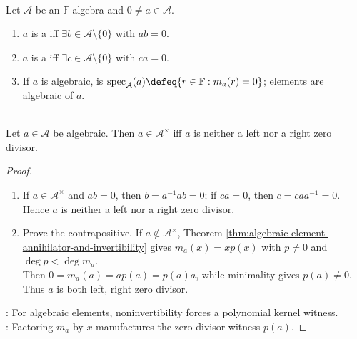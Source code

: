 \begin{definition} \label{def:algebra-zero-divisors-and-spectrum} \\
Let $\mathcal{A}$ be an $\mathbb{F}$-algebra and $0\neq a\in\mathcal{A}$.
\begin{enumerate}[label=(\roman*)]
\setlength{\itemsep}{0pt}
\item $a$ is a  iff $\exists b\in\mathcal{A}\setminus\{0\}$ with $ab=0$.
\item $a$ is a  iff $\exists c\in\mathcal{A}\setminus\{0\}$ with $ca=0$.
\item If $a$ is algebraic,  is $\operatorname{spec}_{\mathcal{A}}(a)\defeq\{r\in\mathbb{F}:m_a(r)=0\}$; elements are algebraic  of $a$.
\end{enumerate}
\end{definition}

\begin{theorem} \label{thm:algebraic-invertible-iff-not-zero-divisor} \\
Let $a\in\mathcal{A}$ be algebraic. Then $a\in\mathcal{A}^{\times}$ iff $a$ is neither a left nor a right zero divisor.
\begin{proof}
\begin{enumerate}[label=\roman*.]
\setlength{\itemsep}{0pt}
\item[$(\Rightarrow)$] If $a\in\mathcal{A}^{\times}$ and $ab=0$, then $b=a^{-1}ab=0$; if $ca=0$, then $c=caa^{-1}=0$.\\
Hence $a$ is neither a left nor a right zero divisor.
\item[$(\Leftarrow)$] Prove the contrapositive. If $a\notin\mathcal{A}^{\times}$, Theorem \ref{thm:algebraic-element-annihilator-and-invertibility} gives $m_a(x)=xp(x)$ with $p\neq0$ and $\deg p<\deg m_a$.\\
Then $0=m_a(a)=ap(a)=p(a)a$, while minimality gives $p(a)\neq0$. Thus $a$ is both left, right zero divisor.
\end{enumerate}
: For algebraic elements, noninvertibility forces a polynomial kernel witness.\\
: Factoring $m_a$ by $x$ manufactures the zero-divisor witness $p(a)$.
\end{proof}
\end{theorem}

